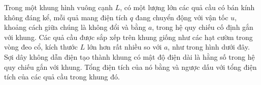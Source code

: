 \begin{vd}
  Trong một khung hình vuông cạnh $L$, có một lượng lớn các quả cầu có bán kính không đáng kể, mỗi quả mang điện tích $q$ đang chuyển động với vận tốc $u$, khoảng cách giữa chúng là không đổi và bằng $a$, trong hệ quy chiếu cố định gắn với khung. Các quả cầu được sắp xếp trên khung giống như các hạt cườm trong vòng đeo cổ, kích thước $L$ lớn hơn rất nhiều so với $a$, như trong hình dưới đây. Sợi dây không dẫn điện tạo thành khung có mật độ điện dài là hằng số trong hệ quy chiếu gắn với khung. Tổng điện tích của nó bằng và ngược dấu với tổng điện tích của các quả cầu trong khung đó.
  \begin{center}







\begin{tikzpicture}[x=0.75pt,y=0.75pt,yscale=-1,xscale=1]


\end{tikzpicture}
\end{center}
\end{vd}

